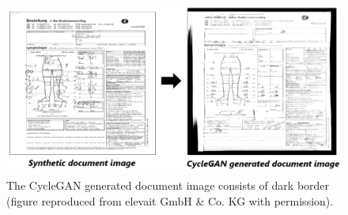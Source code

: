 \begin{figure}[H]
        \begin{center}
	    \includegraphics[scale=0.50]{images/Evaluation/failure3.png}
	    \caption[The \ac{CycleGAN} generated document image consists of dark border.]{The \ac{CycleGAN} generated document image consists of dark border (figure reproduced from elevait GmbH \& Co. KG with permission).}
	    \label{fig:failure3}
	    \end{center}
\end{figure}


